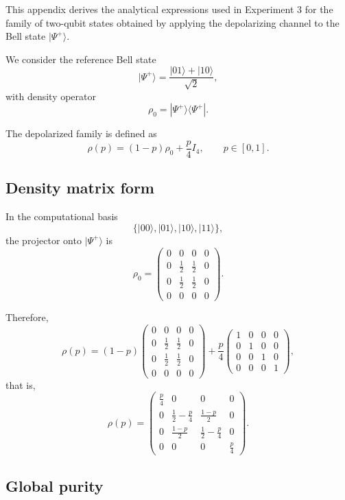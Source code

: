 \documentclass[a4paper]{article}
\begin{document}
This appendix derives the analytical expressions used in Experiment 3 for the family of two-qubit states obtained by applying the depolarizing channel to the Bell state \(|\Psi^+\rangle\).

We consider the reference Bell state
\[
|\Psi^+\rangle = \frac{|01\rangle + |10\rangle}{\sqrt{2}},
\]
with density operator
\[
\rho_0 = |\Psi^+\rangle\langle\Psi^+|.
\]

The depolarized family is defined as
\[
\rho(p) = (1-p)\rho_0 + \frac{p}{4}I_4,
\qquad p \in [0,1].
\]

\subsection*{Density matrix form}

In the computational basis
\[
\{|00\rangle, |01\rangle, |10\rangle, |11\rangle\},
\]
the projector onto \(|\Psi^+\rangle\) is
\[
\rho_0
=
\begin{pmatrix}
0 & 0 & 0 & 0\\
0 & \frac12 & \frac12 & 0\\
0 & \frac12 & \frac12 & 0\\
0 & 0 & 0 & 0
\end{pmatrix}.
\]

Therefore,
\[
\rho(p)
=
(1-p)
\begin{pmatrix}
0 & 0 & 0 & 0\\
0 & \frac12 & \frac12 & 0\\
0 & \frac12 & \frac12 & 0\\
0 & 0 & 0 & 0
\end{pmatrix}
+
\frac{p}{4}
\begin{pmatrix}
1 & 0 & 0 & 0\\
0 & 1 & 0 & 0\\
0 & 0 & 1 & 0\\
0 & 0 & 0 & 1
\end{pmatrix},
\]
that is,
\[
\rho(p)
=
\begin{pmatrix}
\frac p4 & 0 & 0 & 0\\
0 & \frac12-\frac p4 & \frac{1-p}{2} & 0\\
0 & \frac{1-p}{2} & \frac12-\frac p4 & 0\\
0 & 0 & 0 & \frac p4
\end{pmatrix}.
\]

\subsection*{Global purity}
\end{document}
